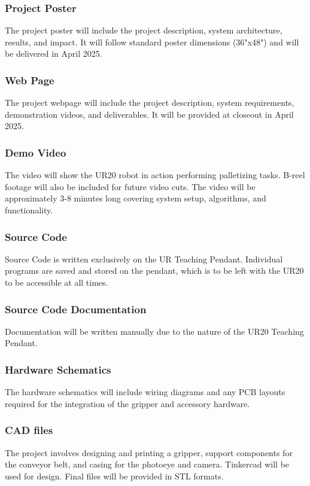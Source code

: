 \subsubsection{Project Poster}
The project poster will include the project description, system architecture, results, and impact. It will follow standard poster dimensions (36"x48") and will be delivered in April 2025.

\subsubsection{Web Page}
The project webpage will include the project description, system requirements, demonstration videos, and deliverables. It will be provided at closeout in April 2025.

\subsubsection{Demo Video}
The video will show the UR20 robot in action performing palletizing tasks. B-reel footage will also be included for future video cuts. The video will be approximately 3-8 minutes long covering system setup, algorithms, and functionality.

\subsubsection{Source Code}
Source Code is written exclusively on the UR Teaching Pendant. Individual programs are saved and stored on the pendant, which is to be left with the UR20 to be accessible at all times. 

\subsubsection{Source Code Documentation}
Documentation will be written manually due to the nature of the UR20 Teaching Pendant.

\subsubsection{Hardware Schematics}
The hardware schematics will include wiring diagrams and any PCB layouts required for the integration of the gripper and accessory hardware.

\subsubsection{CAD files}
The project involves designing and printing a gripper, support components for the conveyor belt, and casing for the photoeye and camera. Tinkercad will be used for design. Final files will be provided in STL formats.

